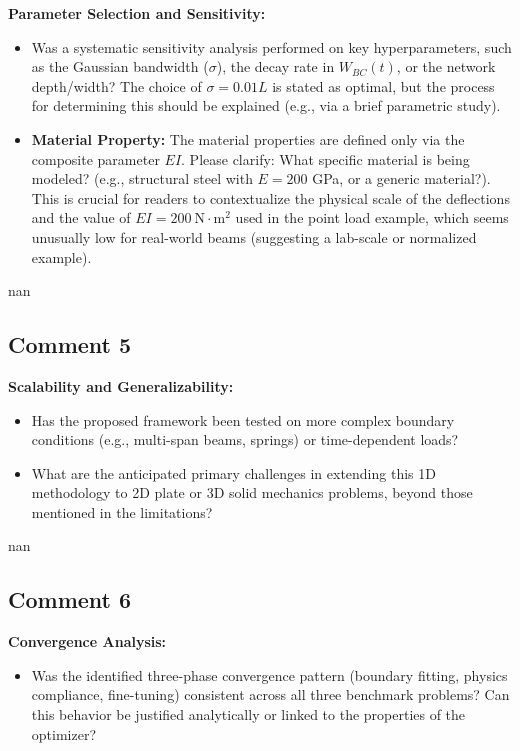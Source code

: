 \documentclass{ar2rc}
\begin{document}
	\RC\textbf{Parameter Selection and Sensitivity:}
    \begin{itemize}
        \item Was a systematic sensitivity analysis performed on key hyperparameters, such as the Gaussian bandwidth ($\sigma$), the decay rate in $W_{BC}(t)$, or the network depth/width? The choice of $\sigma=0.01L$ is stated as optimal, but the process for determining this should be explained (e.g., via a brief parametric study).
        \item \textbf{Material Property:} The material properties are defined only via the composite parameter $EI$. Please clarify: What specific material is being modeled? (e.g., structural steel with $E=200$ GPa, or a generic material?). This is crucial for readers to contextualize the physical scale of the deflections and the value of $EI=200\ \mathrm{N\cdot m^2}$ used in the point load example, which seems unusually low for real-world beams (suggesting a lab-scale or normalized example).
    \end{itemize}

	\AR nan

  \subsection{Comment 5}
	
	\RC\textbf{Scalability and Generalizability:}
    \begin{itemize}
        \item Has the proposed framework been tested on more complex boundary conditions (e.g., multi-span beams, springs) or time-dependent loads?
        \item What are the anticipated primary challenges in extending this 1D methodology to 2D plate or 3D solid mechanics problems, beyond those mentioned in the limitations?
    \end{itemize}

	\AR nan

	\subsection{Comment 6}

  \RC\textbf{Convergence Analysis:}
    \begin{itemize}
        \item Was the identified three-phase convergence pattern (boundary fitting, physics compliance, fine-tuning) consistent across all three benchmark problems? Can this behavior be justified analytically or linked to the properties of the optimizer?
    \end{itemize}
\end{document}
